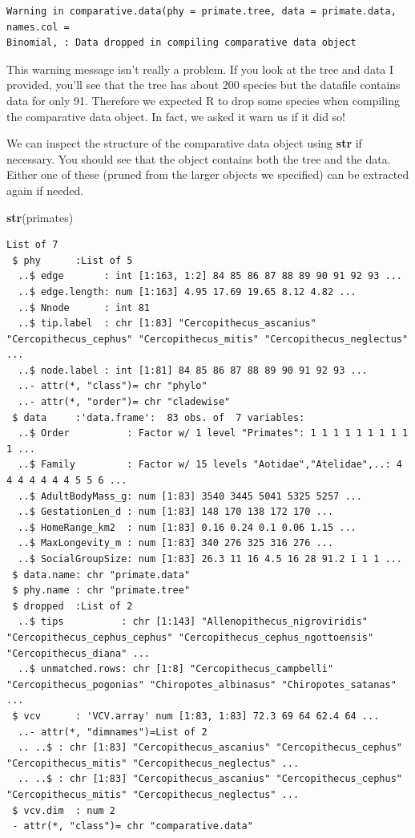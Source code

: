\documentclass[
]{book}
\newenvironment{Shaded}{\begin{snugshade}}{\end{snugshade}}
\newcommand{\KeywordTok}[1]{\textcolor[rgb]{0.13,0.29,0.53}{\textbf{#1}}}
\newcommand{\NormalTok}[1]{#1}
\begin{document}
\begin{verbatim}
Warning in comparative.data(phy = primate.tree, data = primate.data, names.col =
Binomial, : Data dropped in compiling comparative data object
\end{verbatim}

This warning message isn't really a problem. If you look at the tree and data I provided, you'll see that the tree has about 200 species but the datafile contains data for only 91. Therefore we expected R to drop some species when compiling the comparative data object. In fact, we asked it warn us if it did so!

We can inspect the structure of the comparative data object using \textbf{str} if necessary. You should see that the object contains both the tree and the data. Either one of these (pruned from the larger objects we specified) can be extracted again if needed.

\begin{Shaded}
\begin{Highlighting}[]
\KeywordTok{str}\NormalTok{(primates)}
\end{Highlighting}
\end{Shaded}

\begin{verbatim}
List of 7
 $ phy      :List of 5
  ..$ edge       : int [1:163, 1:2] 84 85 86 87 88 89 90 91 92 93 ...
  ..$ edge.length: num [1:163] 4.95 17.69 19.65 8.12 4.82 ...
  ..$ Nnode      : int 81
  ..$ tip.label  : chr [1:83] "Cercopithecus_ascanius" "Cercopithecus_cephus" "Cercopithecus_mitis" "Cercopithecus_neglectus" ...
  ..$ node.label : int [1:81] 84 85 86 87 88 89 90 91 92 93 ...
  ..- attr(*, "class")= chr "phylo"
  ..- attr(*, "order")= chr "cladewise"
 $ data     :'data.frame':  83 obs. of  7 variables:
  ..$ Order          : Factor w/ 1 level "Primates": 1 1 1 1 1 1 1 1 1 1 ...
  ..$ Family         : Factor w/ 15 levels "Aotidae","Atelidae",..: 4 4 4 4 4 4 4 5 5 6 ...
  ..$ AdultBodyMass_g: num [1:83] 3540 3445 5041 5325 5257 ...
  ..$ GestationLen_d : num [1:83] 148 170 138 172 170 ...
  ..$ HomeRange_km2  : num [1:83] 0.16 0.24 0.1 0.06 1.15 ...
  ..$ MaxLongevity_m : num [1:83] 340 276 325 316 276 ...
  ..$ SocialGroupSize: num [1:83] 26.3 11 16 4.5 16 28 91.2 1 1 1 ...
 $ data.name: chr "primate.data"
 $ phy.name : chr "primate.tree"
 $ dropped  :List of 2
  ..$ tips          : chr [1:143] "Allenopithecus_nigroviridis" "Cercopithecus_cephus_cephus" "Cercopithecus_cephus_ngottoensis" "Cercopithecus_diana" ...
  ..$ unmatched.rows: chr [1:8] "Cercopithecus_campbelli" "Cercopithecus_pogonias" "Chiropotes_albinasus" "Chiropotes_satanas" ...
 $ vcv      : 'VCV.array' num [1:83, 1:83] 72.3 69 64 62.4 64 ...
  ..- attr(*, "dimnames")=List of 2
  .. ..$ : chr [1:83] "Cercopithecus_ascanius" "Cercopithecus_cephus" "Cercopithecus_mitis" "Cercopithecus_neglectus" ...
  .. ..$ : chr [1:83] "Cercopithecus_ascanius" "Cercopithecus_cephus" "Cercopithecus_mitis" "Cercopithecus_neglectus" ...
 $ vcv.dim  : num 2
 - attr(*, "class")= chr "comparative.data"
\end{verbatim}
\end{document}
